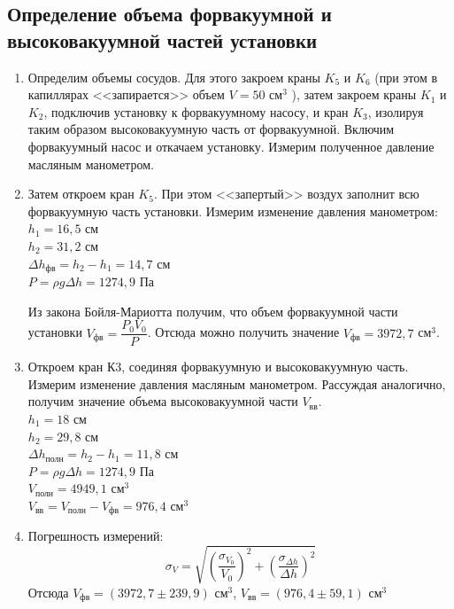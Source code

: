 \documentclass[a4paper,12pt]{article}
\theoremstyle{plain} %
\theoremstyle{definition} %
\theoremstyle{remark} %
\begin{document}
\subsection{Определение объема форвакуумной и высоковакуумной частей установки}
\begin{enumerate}
\item
Определим объемы сосудов. Для этого закроем краны $K_5$ и $K_6$ (при этом в капиллярах <<запирается>> объем $V = 50$ см$^3$ ), затем закроем краны $K_1$ и $K_2$, подключив установку к форвакуумному насосу, и кран $K_3$, изолируя таким образом высоковакуумную часть от форвакуумной. Включим форвакуумный насос и откачаем установку. Измерим полученное давление масляным манометром.
\item
Затем откроем кран $K_5$. При этом <<запертый>> воздух заполнит всю форвакуумную часть установки. Измерим изменение давления манометром: \\
$h_1 = 16,5$ см \\
$h_2 = 31,2$ см \\
$\Delta h_\textit{фв} = h_2 - h_1 = 14,7$ см \\
$P = \rho g \Delta h = 1274,9$ Па

Из закона Бойля-Мариотта получим, что объем форвакуумной части установки $V_\textit{фв} = \dfrac{P_0V_0}{P}$. Отсюда можно получить значение $V_\textit{фв} = 3972,7$ см$^3$.
\item
Откроем кран К3, соединяя форвакуумную и высоковакуумную часть. Измерим изменение давления масляным манометром. Рассуждая аналогично, получим значение объема высоковакуумной части $V_\textit{вв}$. \\
$h_1 = 18$ см \\
$h_2 = 29,8$ см \\
$\Delta h_\textit{полн} = h_2 - h_1 = 11,8$ см \\
$P = \rho g \Delta h = 1274,9$ Па \\
$V_\textit{полн} = 4949,1$ см$^3$ \\
$V_\textit{вв} = V_\textit{полн} - V_\textit{фв} = 976,4$ см$^3$
\item
Погрешность измерений: \\
\[\sigma_V = \sqrt{(\dfrac{\sigma_{V_0}}{V_0})^2 + (\dfrac{\sigma_{\Delta h}}{\Delta h})^2 }\]
Отсюда $V_\textit{фв} = (3972,7 \pm 239,9)$ см$^3$, $V_\textit{вв} = (976,4 \pm 59,1)$ см$^3$

\end{enumerate}
\end{document}
